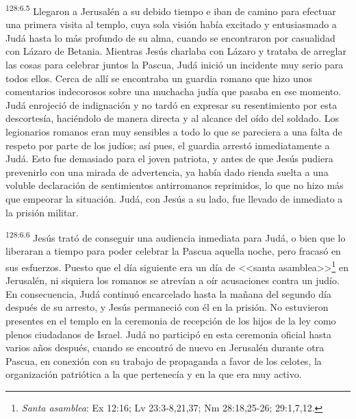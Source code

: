 \par 
\textsuperscript{128:6.5} Llegaron a Jerusalén a su debido tiempo e iban de camino para efectuar una primera visita al templo, cuya sola visión había excitado y entusiasmado a Judá hasta lo más profundo de su alma, cuando se encontraron por casualidad con Lázaro de Betania. Mientras Jesús charlaba con Lázaro y trataba de arreglar las cosas para celebrar juntos la Pascua, Judá inició un incidente muy serio para todos ellos. Cerca de allí se encontraba un guardia romano que hizo unos comentarios indecorosos sobre una muchacha judía que pasaba en ese momento. Judá enrojeció de indignación y no tardó en expresar su resentimiento por esta descortesía, haciéndolo de manera directa y al alcance del oído del soldado. Los legionarios romanos eran muy sensibles a todo lo que se pareciera a una falta de respeto por parte de los judíos; así pues, el guardia arrestó inmediatamente a Judá. Esto fue demasiado para el joven patriota, y antes de que Jesús pudiera prevenirlo con una mirada de advertencia, ya había dado rienda suelta a una voluble declaración de sentimientos antirromanos reprimidos, lo que no hizo más que empeorar la situación. Judá, con Jesús a su lado, fue llevado de inmediato a la prisión militar.

\par 
\textsuperscript{128:6.6} Jesús trató de conseguir una audiencia inmediata para Judá, o bien que lo liberaran a tiempo para poder celebrar la Pascua aquella noche, pero fracasó en sus esfuerzos. Puesto que el día siguiente era un día de <<santa asamblea>>\footnote{\textit{Santa asamblea}: Ex 12:16; Lv 23:3-8,21,37; Nm 28:18,25-26; 29:1,7,12.} en Jerusalén, ni siquiera los romanos se atrevían a oír acusaciones contra un judío. En consecuencia, Judá continuó encarcelado hasta la mañana del segundo día después de su arresto, y Jesús permaneció con él en la prisión. No estuvieron presentes en el templo en la ceremonia de recepción de los hijos de la ley como plenos ciudadanos de Israel. Judá no participó en esta ceremonia oficial hasta varios años después, cuando se encontró de nuevo en Jerusalén durante otra Pascua, en conexión con su trabajo de propaganda a favor de los celotes, la organización patriótica a la que pertenecía y en la que era muy activo.

